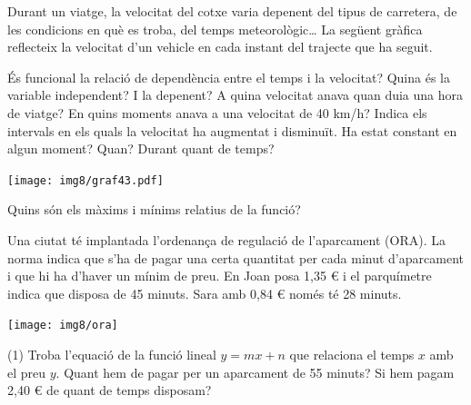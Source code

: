 \begin{mylist}
\exer  Durant un viatge, la velocitat del cotxe varia depenent del tipus de carretera, de les condicions en què es troba, del temps meteorològic{\dots} La següent gràfica reflecteix la velocitat d'un vehicle en cada instant del trajecte que ha seguit.
 
 
	\begin{minipage}{0.5\textwidth}
	\begin{tasks}
	\task  És funcional la relació de dependència entre el temps i la velocitat?
	\task  Quina és la variable independent? I la depenent?
	\task  A quina velocitat anava quan duia una hora de viatge? En quins moments anava a una velocitat de 40 km/h?
		\task  Indica els intervals en els quals la velocitat ha augmentat i disminuït. Ha estat constant en algun moment? Quan? Durant quant de temps?
	\end{tasks}
	\end{minipage}
	\begin{minipage}{0.5\textwidth}
		\centering
		\texttt{[image: img8/graf43.pdf]}
	\end{minipage}
\begin{tasks}
	\task[e)]  Quins són els màxims i mínims relatius de la funció? 
\end{tasks}

 
 
\vspace{-1.75cm}
\exer \begin{minipage}[t]{0.7\textwidth}
	 Una ciutat té implantada l'ordenança de regulació de l'aparcament (ORA). La norma indica que s'ha de pagar una certa quantitat per cada minut d'aparcament i que hi ha d'haver un mínim de preu. En Joan posa 1,35 \euro{} i el parquímetre indica que disposa de 45 minuts. Sara amb 0,84 \euro{} només té 28 minuts.

\end{minipage}
\begin{minipage}{0.3\textwidth}
	\centering
	\vspace{1.5cm}
	\texttt{[image: img8/ora]}
\end{minipage}
	\begin{tasks}(1)
	\task Troba l'equació de la funció lineal $y=mx+n$ que relaciona el temps $x$ amb el preu $y$.
	\task Quant hem de pagar per un aparcament de 55 minuts?	
	\task Si hem pagam 2,40 \euro{} de quant de temps disposam?
\end{tasks}
 

\end{mylist}
